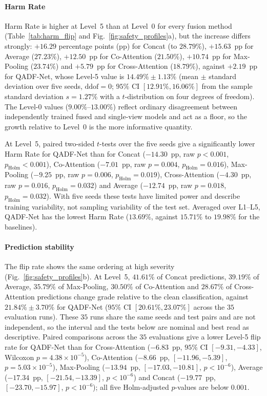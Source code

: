 \documentclass[final,5p,times,twocolumn,authoryear]{elsarticle}
\newcommand{\qadfnet}{QADF-Net}
\theoremstyle{plain}
\theoremstyle{remark}
\begin{document}
\paragraph{Harm Rate} Harm Rate is higher at Level~5 than at Level~0 for every fusion method (Table~\ref{tab:harm_flip} and Fig.~\ref{fig:safety_profiles}a), but the increase differs strongly: $+16.29$ percentage points (pp) for Concat (to $28.79\%$), $+15.63$~pp for Average ($27.23\%$), $+12.50$~pp for Co-Attention ($21.50\%$), $+10.74$~pp for Max-Pooling ($23.74\%$) and $+5.79$~pp for Cross-Attention ($18.79\%$), against $+2.19$~pp for \qadfnet{}, whose Level-5 value is $14.49\% \pm 1.13\%$ (mean $\pm$ standard deviation over five seeds, $\text{ddof}=0$; $95\%$ CI $[12.91\%, 16.06\%]$ from the sample standard deviation $s=1.27\%$ with a $t$-distribution on four degrees of freedom). The Level-0 values ($9.00\%$--$13.00\%$) reflect ordinary disagreement between independently trained fused and single-view models and act as a floor, so the growth relative to Level~0 is the more informative quantity.

At Level~5, paired two-sided $t$-tests over the five seeds give a significantly lower Harm Rate for \qadfnet{} than for Concat ($-14.30$~pp, raw $p<0.001$, $p_{\text{Holm}}<0.001$), Co-Attention ($-7.01$~pp, raw $p=0.004$, $p_{\text{Holm}}=0.016$), Max-Pooling ($-9.25$~pp, raw $p=0.006$, $p_{\text{Holm}}=0.019$), Cross-Attention ($-4.30$~pp, raw $p=0.016$, $p_{\text{Holm}}=0.032$) and Average ($-12.74$~pp, raw $p=0.018$, $p_{\text{Holm}}=0.032$). With five seeds these tests have limited power and describe training variability, not sampling variability of the test set. Averaged over L1--L5, \qadfnet{} has the lowest Harm Rate ($13.69\%$, against $15.71\%$ to $19.98\%$ for the baselines).

\paragraph{Prediction stability} The flip rate shows the same ordering at high severity (Fig.~\ref{fig:safety_profiles}b). At Level~5, $41.61\%$ of Concat predictions, $39.19\%$ of Average, $35.79\%$ of Max-Pooling, $30.50\%$ of Co-Attention and $28.67\%$ of Cross-Attention predictions change grade relative to the clean classification, against $21.84\% \pm 3.70\%$ for \qadfnet{} ($95\%$ CI $[20.61\%, 23.07\%]$ across the $35$ evaluation runs). These $35$ runs share the same seeds and test pairs and are not independent, so the interval and the tests below are nominal and best read as descriptive. Paired comparisons across the $35$ evaluations give a lower Level-5 flip rate for \qadfnet{} than for Cross-Attention ($-6.83$~pp, $95\%$ CI $[-9.31, -4.33]$, Wilcoxon $p=4.38\times10^{-5}$), Co-Attention ($-8.66$~pp, $[-11.96, -5.39]$, $p=5.03\times10^{-5}$), Max-Pooling ($-13.94$~pp, $[-17.03, -10.81]$, $p<10^{-6}$), Average ($-17.34$~pp, $[-21.54, -13.39]$, $p<10^{-6}$) and Concat ($-19.77$~pp, $[-23.70, -15.97]$, $p<10^{-6}$); all five Holm-adjusted $p$-values are below $0.001$.
\end{document}
